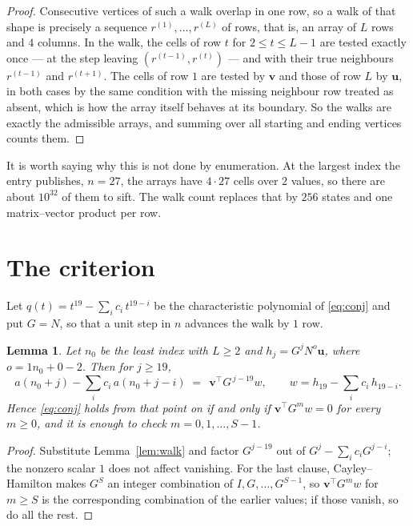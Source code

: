 \documentclass[11pt,a4paper]{article}
\theoremstyle{plain}
\newtheorem{lemma}[theorem]{Lemma}
\theoremstyle{definition}
\begin{document}
\begin{proof}
Consecutive vertices of such a walk overlap in one row, so a walk of that shape is
precisely a sequence $r^{(1)},\dots,r^{(L)}$ of rows, that is, an array of $L$ rows
and $4$ columns. In the walk, the cells of row $t$ for $2\le t\le L-1$ are tested
exactly once --- at the step leaving $(r^{(t-1)},r^{(t)})$ --- and with their true
neighbours $r^{(t-1)}$ and $r^{(t+1)}$. The cells of row $1$ are tested by
$\mathbf{v}$ and those of row $L$ by $\mathbf{u}$, in both cases by the same condition
with the missing neighbour row treated as absent, which is how the array itself behaves at
its boundary. So the walks are exactly the admissible arrays, and summing over all starting
and ending vertices counts them.
\end{proof}


It is worth saying why this is not done by enumeration. At the largest index the entry
publishes, $n=27$, the arrays have $4\cdot27$ cells over
$2$ values, so there are about $10^{32}$ of them to sift. The
walk count replaces that by $256$ states and one matrix--vector product per row.
\section{The criterion}

Let $q(t)=t^{19}-\sum_i c_i\,t^{19-i}$ be the characteristic polynomial of
\eqref{eq:conj} and put $G=N$, so that a unit step in $n$ advances the walk by
$1$ row.

\begin{lemma}\label{lem:crit}
Let $n_0$ be the least index with $L\ge2$ and $h_j=G^{j}N^{o}\mathbf{u}$, where
$o=1n_0+0-2$. Then for $j\ge19$,
\[
a(n_0+j)-\sum_i c_i\,a(n_0+j-i)\;=\;\,\mathbf{v}^{\!\top}G^{\,j-19}w,
\qquad w=h_{19}-\sum_i c_i\,h_{19-i} .
\]
Hence \eqref{eq:conj} holds from that point on if and only if
$\mathbf{v}^{\!\top}G^{m}w=0$ for every $m\ge0$, and it is enough to check
$m=0,1,\dots,S-1$.
\end{lemma}

\begin{proof}
Substitute Lemma~\ref{lem:walk} and factor $G^{j-19}$ out of
$G^{j}-\sum_ic_iG^{j-i}$; the nonzero scalar $1$ does not affect
vanishing. For the last clause, Cayley--Hamilton makes $G^{S}$ an integer combination of
$I,G,\dots,G^{S-1}$, so $\mathbf{v}^{\!\top}G^{m}w$ for $m\ge S$ is the corresponding
combination of the earlier values; if those vanish, so do all the rest.
\end{proof}
\end{document}
